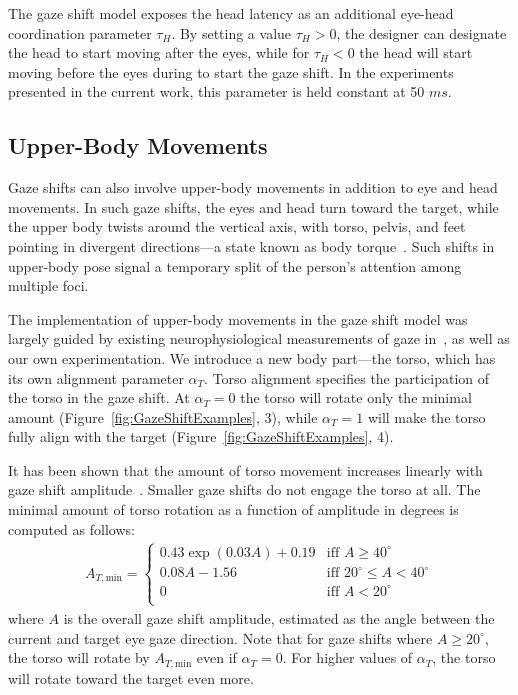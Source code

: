 The gaze shift model exposes the head latency as an additional eye-head coordination parameter $\tau_H$. By setting a value $\tau_H > 0$, the designer can designate the head to start moving after the eyes, while for $\tau_H < 0$ the head will start moving before the eyes during to start the gaze shift. In the experiments presented in the current work, this parameter is held constant at 50 $ms$.

\subsection{Upper-Body Movements}
\label{sec:GazeShiftUpperBody}

Gaze shifts can also involve upper-body movements in addition to eye and head movements. In such gaze shifts, the eyes and head turn toward the target, while the upper body twists around the vertical axis, with torso, pelvis, and feet pointing in divergent directions---a state known as body torque~\citep{schegloff1998bodytorque}. Such shifts in upper-body pose signal a temporary split of the person's attention among multiple foci.

The implementation of upper-body movements in the gaze shift model was largely guided by existing neurophysiological measurements of gaze in~\citep{mccluskey2007monkeys}, as well as our own experimentation. We introduce a new body part---the torso, which has its own alignment parameter $\alpha_T$. Torso alignment specifies the participation of the torso in the gaze shift. At $\alpha_T = 0$ the torso will rotate only the minimal amount (Figure~\ref{fig:GazeShiftExamples}, 3), while $\alpha_T = 1$ will make the torso fully align with the target (Figure~\ref{fig:GazeShiftExamples}, 4).

It has been shown that the amount of torso movement increases linearly with gaze shift amplitude~\citep{mccluskey2007monkeys}. Smaller gaze shifts do not engage the torso at all. The minimal amount of torso rotation as a function of amplitude in degrees is computed as follows:
%
\begin{align}
\label{eq:TorsoAmin}
A_{T,\mathrm{min}} = \begin{cases}
0.43 \mathop{exp}(0.03 A) + 0.19 & \mbox{iff } A \geq 40^{\circ} \\
0.08 A - 1.56 & \mbox{iff } 20^{\circ} \leq A < 40^{\circ} \\
0 & \mbox{iff } A < 20^{\circ} \\
\end{cases}
\end{align}
%
where $A$ is the overall gaze shift amplitude, estimated as the angle between the current and target eye gaze direction. Note that for gaze shifts where $A \geq 20^{\circ}$, the torso will rotate by $A_{T,\mathrm{min}}$ even if $\alpha_T = 0$. For higher values of $\alpha_T$, the torso will rotate toward the target even more.

